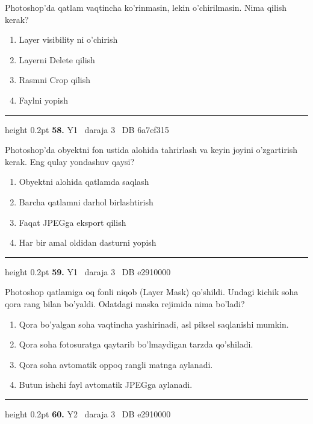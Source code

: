 \documentclass[10pt,a4paper,oneside]{article}
\begin{document}
Photoshop'da qatlam vaqtincha ko'rinmasin, lekin o'chirilmasin. Nima qilish kerak?
\begin{enumerate}[label=\Alph*),leftmargin=9mm]
\item Layer visibility ni o'chirish
\item Layerni Delete qilish
\item Rasmni Crop qilish
\item Faylni yopish
\end{enumerate}
\vspace{2mm}\hrule height 0.2pt \vspace{4mm}
\hypertarget{q58}{\textbf{\color{ink}58.}}  {\color{muted}\scriptsize Y1 \textbullet\ daraja 3 \textbullet\ DB 6a7ef315}
\par
Photoshop'da obyektni fon ustida alohida tahrirlash va keyin joyini o'zgartirish kerak. Eng qulay yondashuv qaysi?
\begin{enumerate}[label=\Alph*),leftmargin=9mm]
\item Obyektni alohida qatlamda saqlash
\item Barcha qatlamni darhol birlashtirish
\item Faqat JPEGga eksport qilish
\item Har bir amal oldidan dasturni yopish
\end{enumerate}
\vspace{2mm}\hrule height 0.2pt \vspace{4mm}
\hypertarget{q59}{\textbf{\color{ink}59.}}  {\color{muted}\scriptsize Y1 \textbullet\ daraja 3 \textbullet\ DB e2910000}
\par
Photoshop qatlamiga oq fonli niqob (Layer Mask) qo'shildi. Undagi kichik soha qora rang bilan bo'yaldi. Odatdagi maska rejimida nima bo'ladi?
\begin{enumerate}[label=\Alph*),leftmargin=9mm]
\item Qora bo'yalgan soha vaqtincha yashirinadi, asl piksel saqlanishi mumkin.
\item Qora soha fotosuratga qaytarib bo'lmaydigan tarzda qo'shiladi.
\item Qora soha avtomatik oppoq rangli matnga aylanadi.
\item Butun ishchi fayl avtomatik JPEGga aylanadi.
\end{enumerate}
\vspace{2mm}\hrule height 0.2pt \vspace{4mm}
\hypertarget{q60}{\textbf{\color{ink}60.}}  {\color{muted}\scriptsize Y2 \textbullet\ daraja 3 \textbullet\ DB e2910000}
\end{document}
